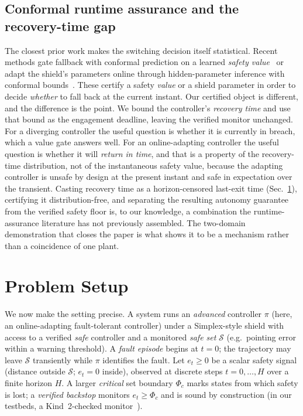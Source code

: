\documentclass[11pt]{article}
\theoremstyle{plain}
\theoremstyle{definition}
\newcommand{\Sset}{\mathcal{S}}
\begin{document}
\subsection{Conformal runtime assurance and the recovery-time gap} The closest prior work
makes the switching decision itself statistical. Recent methods gate fallback with conformal
prediction on a learned \emph{safety value}~\cite{Tabbara2025} or adapt the shield's
parameters online through hidden-parameter inference with conformal bounds~\cite{Kwon2025}.
These certify a safety \emph{value} or a shield parameter in order to decide \emph{whether}
to fall back at the current instant. Our certified object is different, and the difference is
the point. We bound the controller's \emph{recovery time} and use that bound as the
engagement deadline, leaving the verified monitor unchanged. For a diverging controller the
useful question is whether it is currently in breach, which a value gate answers well. For an
online-adapting controller the useful question is whether it will \emph{return in time}, and
that is a property of the recovery-time distribution, not of the instantaneous safety value,
because the adapting controller is unsafe by design at the present instant and safe in
expectation over the transient. Casting recovery time as a horizon-censored last-exit time
(Sec.~\ref{sec:setup}), certifying it distribution-free,
and separating the resulting autonomy guarantee from the verified safety floor is, to our
knowledge, a combination the runtime-assurance literature has not previously assembled. The
two-domain demonstration that closes the paper is what shows it to be a mechanism rather than
a coincidence of one plant.

\section{Problem Setup}
\label{sec:setup}
We now make the setting precise. A system runs an \emph{advanced} controller $\pi$ (here, an
online-adapting fault-tolerant controller) under a Simplex-style shield with access to a
verified \emph{safe} controller
and a monitored \emph{safe set} $\Sset$ (e.g.\ pointing error within a warning threshold).
A \emph{fault episode} begins at $t=0$; the trajectory may leave $\Sset$ transiently while
$\pi$ identifies the fault. Let $e_t \ge 0$ be a scalar safety signal (distance outside
$\Sset$; $e_t=0$ inside), observed at discrete steps $t=0,\dots,H$ over a finite horizon
$H$. A larger \emph{critical} set boundary $\Phi_c$ marks states from which safety is lost;
a \emph{verified backstop} monitors $e_t \ge \Phi_c$ and is sound by construction (in our
testbeds, a Kind~2-checked monitor~\cite{Champion2016}).
\end{document}
